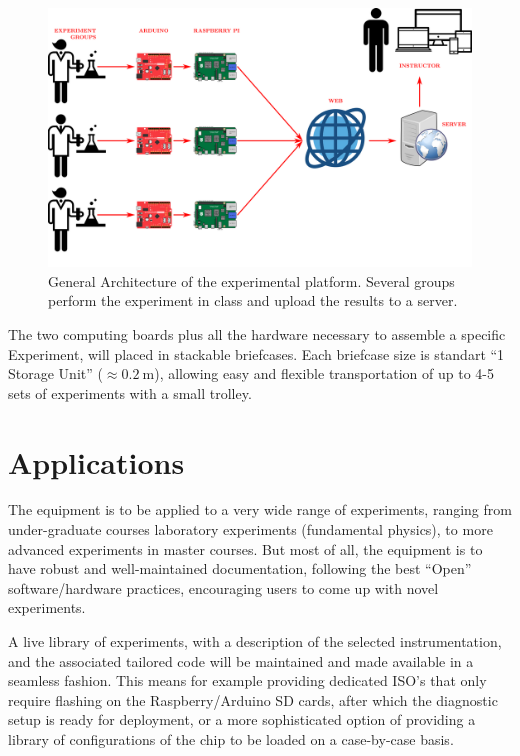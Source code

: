 \documentclass[conference]{IEEEtran}
\begin{document}
\begin{figure}[tbp]
\centerline{\includegraphics[width=1.0\columnwidth]{Multiple.png}}
\caption{General Architecture of the experimental platform. Several groups perform the experiment in class and upload the results to a server.}
\label{figMultiple}
\end{figure}

The two computing boards plus all the hardware necessary to assemble a specific Experiment, will placed in stackable briefcases.
Each briefcase size is standart “1 Storage Unit” ($\approx \SI{0.2}{\meter}$), allowing easy and flexible transportation of up to 4-5 sets of experiments with a small trolley.


\section{Applications}
The equipment is to be applied to a very wide range of experiments, ranging from under-graduate courses laboratory experiments (fundamental physics), 
to more advanced experiments in master courses. 
But most of all, the equipment is to have robust and well-maintained documentation, 
following the best ``Open'' software/hardware practices, encouraging users to come up with novel experiments.

A live library of experiments, with a description of the selected instrumentation, and the associated tailored code will be maintained and made available in a seamless fashion. 
This means for example providing dedicated ISO’s that only require flashing on the Raspberry/Arduino SD cards, after which the diagnostic setup is ready for deployment,
or a more sophisticated option of providing a library of configurations of the chip to be loaded on a case-by-case basis.
\end{document}
